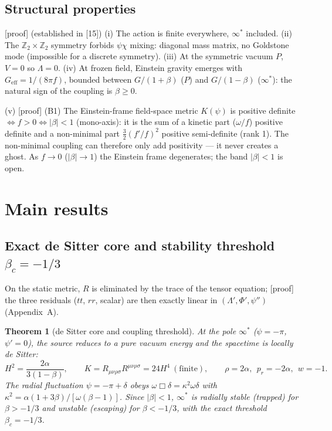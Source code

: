 \documentclass[11pt,a4paper]{article}
\newcommand{\statut}[1]{{\footnotesize\textsf{[#1]}}}
\theoremstyle{plain}
\newtheorem{theorem}{Theorem}
\theoremstyle{remark}
\begin{document}
\subsection{Structural properties}
\statut{proof} (established in [15]) (i) The action is finite everywhere, $\infty^*$
included. (ii) The $\mathbb{Z}_2\times\mathbb{Z}_2$ symmetry forbids $\psi\chi$ mixing:
diagonal mass matrix, no Goldstone mode (impossible for a discrete symmetry). (iii) At the
symmetric vacuum $P$, $V=0$ so $\Lambda=0$. (iv) At frozen field, Einstein gravity emerges
with $G_{\mathrm{eff}}=1/(8\pi f)$, bounded between $G/(1+\beta)$ ($P$) and $G/(1-\beta)$
($\infty^*$): the natural sign of the coupling is $\beta\ge0$.
\par\smallskip
(v) \statut{proof} (B1) The Einstein-frame field-space metric $K(\psi)$ is positive definite
$\Leftrightarrow f>0\Leftrightarrow|\beta|<1$ (mono-axis): it is the sum of a kinetic part
($\omega/f$) positive definite and a non-minimal part $\tfrac32(f'/f)^2$ positive
semi-definite (rank 1). The non-minimal coupling can therefore only add positivity --- it
never creates a ghost. As $f\to0$ ($|\beta|\to1$) the Einstein frame degenerates; the band
$|\beta|<1$ is open.

\section{Main results}
\subsection{Exact de Sitter core and stability threshold $\beta_c=-1/3$}
On the static metric, $R$ is eliminated by the trace of the tensor equation; \statut{proof}
the three residuals ($tt$, $rr$, scalar) are then exactly linear in
$(\Lambda',\Phi',\psi'')$ (Appendix~A).

\begin{theorem}[de Sitter core and coupling threshold]\label{thm:core}
At the pole $\infty^*$ ($\psi=-\pi$, $\psi'=0$), the source reduces to a pure vacuum energy
and the spacetime is locally de Sitter:
\begin{equation}
H^2=\frac{2\alpha}{3(1-\beta)},\qquad K=R_{\mu\nu\rho\sigma}R^{\mu\nu\rho\sigma}=24H^4\ (\text{finite}),
\qquad \rho=2\alpha,\ \ p_r=-2\alpha,\ \ w=-1.
\end{equation}
The radial fluctuation $\psi=-\pi+\delta$ obeys $\omega\Box\delta=\kappa^2\omega\delta$ with
$\kappa^2=\alpha(1+3\beta)/[\omega(\beta-1)]$. Since $|\beta|<1$, $\infty^*$ is radially
stable (trapped) for $\beta>-1/3$ and unstable (escaping) for $\beta<-1/3$, with the exact
threshold $\boxed{\beta_c=-1/3}$.
\end{theorem}
\end{document}
